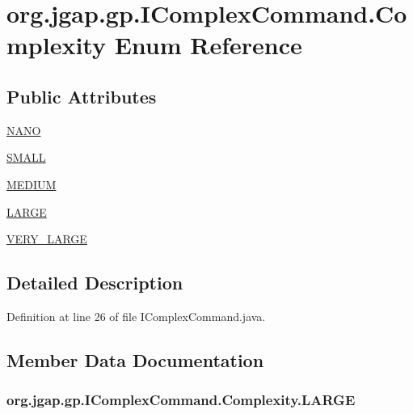 \hypertarget{enumorg_1_1jgap_1_1gp_1_1_i_complex_command_1_1_complexity}{\section{org.\-jgap.\-gp.\-I\-Complex\-Command.\-Complexity Enum Reference}
\label{enumorg_1_1jgap_1_1gp_1_1_i_complex_command_1_1_complexity}
}
\subsection*{Public Attributes}
\begin{DoxyCompactItemize}
\item 
\hyperlink{enumorg_1_1jgap_1_1gp_1_1_i_complex_command_1_1_complexity_ae212971fc8c47fc7794aad627705901f}{N\-A\-N\-O}
\item 
\hyperlink{enumorg_1_1jgap_1_1gp_1_1_i_complex_command_1_1_complexity_aa9b89dc38565c1d7d691b3d3900d9a22}{S\-M\-A\-L\-L}
\item 
\hyperlink{enumorg_1_1jgap_1_1gp_1_1_i_complex_command_1_1_complexity_abe1155eb313e9cb823b8d5036a412a3d}{M\-E\-D\-I\-U\-M}
\item 
\hyperlink{enumorg_1_1jgap_1_1gp_1_1_i_complex_command_1_1_complexity_ae50f26e928e4a62b630ee759332060a3}{L\-A\-R\-G\-E}
\item 
\hyperlink{enumorg_1_1jgap_1_1gp_1_1_i_complex_command_1_1_complexity_ab639d2f5657cc33b0b2ef410d7d23a66}{V\-E\-R\-Y\-\_\-\-L\-A\-R\-G\-E}
\end{DoxyCompactItemize}


\subsection{Detailed Description}


Definition at line 26 of file I\-Complex\-Command.\-java.



\subsection{Member Data Documentation}
\hypertarget{enumorg_1_1jgap_1_1gp_1_1_i_complex_command_1_1_complexity_ae50f26e928e4a62b630ee759332060a3}{
\subsubsection[{L\-A\-R\-G\-E}]{\setlength{\rightskip}{0pt plus 5cm}org.\-jgap.\-gp.\-I\-Complex\-Command.\-Complexity.\-L\-A\-R\-G\-E}}\label{enumorg_1_1jgap_1_1gp_1_1_i_complex_command_1_1_complexity_ae50f26e928e4a62b630ee759332060a3}


